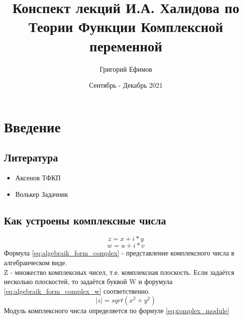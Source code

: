 \documentclass{article}
\title{Конспект лекций И.А. Халидова по Теории Функции Комплексной переменной}
\author{Григорий Ефимов}
\date{Сентябрь - Декабрь 2021}
\begin{document}
\begin{titlepage}
\maketitle
\end{titlepage}
\tableofcontents
\newpage
\section{Введение}
\subsection{Литература}
\begin{itemize}
	\item Аксенов ТФКП
	\item Волькер Задачник
\end{itemize}
\newpage
\subsection{Как устроены комплексные числа}
\begin{equation}\label{eq:algebraik_form_complex}
z=x+i*y
\end{equation}
\begin{equation}\label{eq:algebraik_form_complex_w}
w=u+i*v
\end{equation}
Формула \ref{eq:algebraik_form_complex} - представление комплексного числа в алгебраическом виде.\\
Z - множество комплексных чисел, т.е. комплексная плоскость. Если задаётся несколько плоскостей, то задаётся буквой W и форумула \ref{eq:algebraik_form_complex_w} соответственно.
\begin{equation}\label{eq:сomplex_module}
|z|=sqrt(x^2+y^2)
\end{equation}
Модуль комплексного числа определяется по формуле \ref{eq:сomplex_module}
\end{document}
